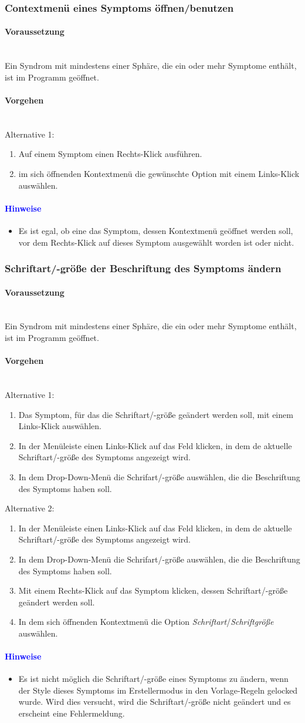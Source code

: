 \documentclass[enabledeprecatedfontcommands,fontsize=11pt,paper=a4,twoside]{scrartcl}
\newcommand*{\hint}{\paragraph{\textcolor{blue}{Hinweise}}}
\newcommand*{\condition}{\paragraph{Voraussetzung}$\;$ \vspace{0.2cm}\\}
\newcommand*{\actions}{\paragraph{Vorgehen} $\;$\vspace{0.2cm}\\}
\begin{document}
		\subsubsection{Contextmenü eines Symptoms öffnen/benutzen}
				\condition 	
		Ein Syndrom mit mindestens einer Sphäre, die ein oder mehr Symptome enthält, ist im Programm geöffnet. 
		\actions  
		Alternative 1:
		\begin{enumerate}
			\item Auf einem Symptom einen Rechts-Klick ausführen.
			\item im sich öffnenden Kontextmenü die gewünschte Option mit einem Links-Klick auswählen.
		\end{enumerate}
		\hint
		\begin{itemize}
			\item Es ist egal, ob eine das Symptom, dessen Kontextmenü geöffnet werden soll, vor dem Rechts-Klick auf dieses Symptom ausgewählt worden ist oder nicht.
		\end{itemize}
		\subsubsection{Schriftart/-größe der Beschriftung des Symptoms ändern}
				\condition 	
		Ein Syndrom mit mindestens einer Sphäre, die ein oder mehr Symptome enthält, ist im Programm geöffnet. 
		\actions  
		Alternative 1:
		\begin{enumerate}
			\item Das Symptom, für das die Schriftart/-größe geändert werden soll, mit einem Links-Klick auswählen.
			\item In der Menüleiste einen Links-Klick auf das Feld klicken, in dem de aktuelle Schriftart/-größe des Symptoms angezeigt wird.
			\item In dem Drop-Down-Menü die Schrifart/-größe auswählen, die die Beschriftung des Symptoms haben soll.
		\end{enumerate}
		Alternative 2:
			\begin{enumerate}
			\item In der Menüleiste einen Links-Klick auf das Feld klicken, in dem de aktuelle Schriftart/-größe des Symptoms angezeigt wird.
			\item In dem Drop-Down-Menü die Schrifart/-größe auswählen, die die Beschriftung des Symptoms haben soll.
			\item Mit einem Rechts-Klick auf das Symptom klicken, dessen Schriftart/-größe geändert werden soll.
			\item In dem sich öffnenden Kontextmenü die Option \textit{Schriftart}/\textit{Schriftgröße} auswählen.
		\end{enumerate}
		\hint
		\begin{itemize}
			\item Es ist nicht möglich die Schriftart/-größe eines Symptoms zu ändern, wenn der Style dieses Symptoms im Erstellermodus in den Vorlage-Regeln gelocked wurde. Wird dies versucht, wird die Schriftart/-größe nicht geändert und es erscheint eine Fehlermeldung.
			\end{itemize}
\end{document}
